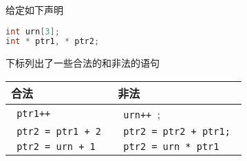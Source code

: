 \begin{frame}[fragile]
给定如下声明
\begin{lstlisting}[language=c,backgroundcolor=\color{red!20}]
int urn[3];
int * ptr1, * ptr2;
\end{lstlisting}
下标列出了一些合法的和非法的语句
\begin{table}
\centering
\begin{tabular}{p{4cm}|p{6cm}}\hline
合法& 非法 \\ \hline
\lstinline| ptr1++ | & \lstinline| urn++ |; \\[0.1cm]
\lstinline| ptr2 = ptr1 + 2 | &\lstinline| ptr2 = ptr2 + ptr1; | \\[0.1cm]
\lstinline| ptr2 = urn + 1 | & \lstinline| ptr2 = urn * ptr1 | \\ \hline
\end{tabular}
\end{table}
\end{frame}

